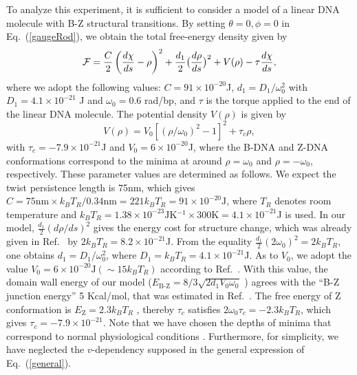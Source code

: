 \documentclass[pre,showpacs,twocolumn,superscriptaddress]{revtex4}
\newcommand{\cF}{ {\cal F} }
\begin{document}
To analyze this experiment,
it is sufficient to consider a model of
a linear DNA molecule with B-Z structural transitions.
By setting  $\theta=0,\phi=0$ in Eq.~(\ref{gaugeRod}),
we obtain the total free-energy density given by
\begin{equation}
\cF=\frac{C}{2}\left(\frac{d\chi}{ds}- \rho \right)^2+
\frac{d_1}{2}\big(\frac{d\rho}{ds}\big)^2
+V(\rho)-\tau  \frac{d\chi}{ds},
\end{equation}
where we adopt the following values:
$C=91 \times 10^{-20}$J,
$d_1=D_1/\omega_0^2$ with $D_1=4.1 \times 10^{-21}$ J and 
$\omega_0=0.6$ rad/bp,
and
$\tau$ is the torque applied to the end of the linear DNA molecule.
The potential density $V(\rho)$
is given by
\begin{equation}
V(\rho) = V_0[(\rho/\omega_0)^2 - 1]^2+\tau_c {\rho},
\end{equation}
with
$\tau_c=-7.9 \times 10^{-21}$J \cite{marko2007} 
and
$V_0 = 6  \times 10^{-20}$J,
where the B-DNA and Z-DNA conformations
correspond to the minima at around
$\rho=\omega_0$ and
$\rho=-\omega_0$, respectively.
These parameter values are determined as follows.
We expect the twist persistence length is 75nm,
which gives
$
C=75 \text{nm}\times k_B T_R/0.34\text{nm}
=221 k_B T_R =91 \times 10^{-20}\text{J}
$,
where 
$T_R$ denotes room temperature and
$k_B T_R=1.38\times 10^{-23}\text{JK$^{-1}$}\times300
\text{K}=4.1\times 10^{-21}$J is used.
In our model,
$\frac{d_1}{2}(d\rho/ds)^2$ gives
the energy cost for structure change,
which was already given in Ref.~\cite{phi4} by $2 k_B T_R=8.2\times 10^{-21} $J.
From the equality
$\frac{d_1}{2}(2 \omega_0)^2=2 k_B T_R$,
one obtains
$d_1=D_1/\omega_0^2$,
where $D_1=k_B T_R=4.1\times10^{-21}$J.
As to $V_0$,
we adopt the value
$V_0=6\times 10^{-20} \text{J}(\sim 15 k_B T_R)$ 
according to  Ref.~\cite{phi4}.
With this value,
the domain wall energy of our model 
($E_{\text{B-Z}}=8/3\sqrt{2 d_1 V_0 \omega_0}$ \cite{kinknote0})
agrees with the ``B-Z junction energy''  5 Kcal/mol, 
that was estimated in Ref.~\cite{bzjunction}.
The free energy of Z conformation is $E_\text{Z}=2.3 k_B T_R$ \cite{statModel},
thereby
$\tau_c$ satisfies $2 \omega_0 \tau_c  = -2.3k_B T_R$,
which gives
$\tau_c=-7.9 \times 10^{-21}$.
Note that we have chosen the depths of minima
that correspond to normal physiological conditions
\cite{saltNote}. 
Furthermore, for simplicity,
we have neglected the
$v$-dependency supposed in the general expression of Eq.~(\ref{general}). 
\end{document}
